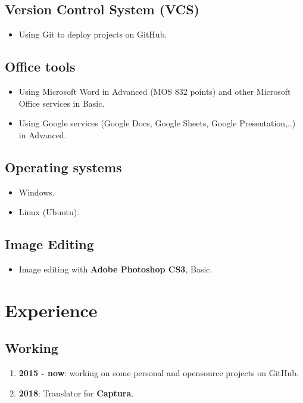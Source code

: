 \documentclass{article}
\begin{document}
        \subsection{Version Control System (VCS)}
        \begin{itemize}
            \item Using Git to deploy projects on GitHub.
        \end{itemize}

        \subsection{Office tools}
        \begin{itemize}
            \item Using Microsoft Word in Advanced (MOS 832 points) and other Microsoft Office services in Basic.
            \item Using Google services (Google Docs, Google Sheets, Google Presentation,..) in Advanced.
        \end{itemize}

        \subsection{Operating systems}
        \begin{itemize}
            \item Windows.
            \item Linux (Ubuntu).
        \end{itemize}

        \subsection{Image Editing}
        \begin{itemize}
            \item Image editing with \textbf{Adobe Photoshop CS3}, Basic.
        \end{itemize}

    \section{Experience}
        \subsection{Working}
            \begin{enumerate}
                \item \textbf{2015 - now}: working on some personal and opensource projects on GitHub.
                \item \textbf{2018}: Translator for \textbf{Captura}\cite{Captura}.
            \end{enumerate}
\end{document}
